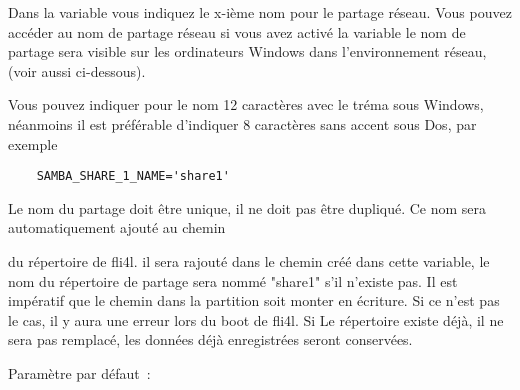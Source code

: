\begin{description}

        Dans la variable  vous indiquez le x-ième
        nom pour le partage réseau. Vous pouvez accéder au nom de partage
        réseau si vous avez activé la variable  le nom de partage
        sera visible sur les ordinateurs Windows dans l'environnement réseau,
        (voir aussi  ci-dessous).

        Vous pouvez indiquer pour le nom 12 caractères avec le tréma sous Windows,
        néanmoins il est préférable d'indiquer 8 caractères sans accent sous Dos,
        par exemple

\begin{example}
\begin{verbatim}
    SAMBA_SHARE_1_NAME='share1'
\end{verbatim}
\end{example}

        Le nom du partage doit être unique, il ne doit pas être
        dupliqué. Ce nom sera automatiquement ajouté au chemin


        du répertoire de fli4l. il sera rajouté dans le chemin créé dans cette
        variable, le nom du répertoire de partage sera nommé "share1" s'il
        n'existe pas. Il est impératif que le chemin dans la partition soit monter
        en écriture. Si ce n'est pas le cas, il y aura une erreur lors du boot
        de fli4l. Si Le répertoire existe déjà, il ne sera pas remplacé, les
        données déjà enregistrées seront conservées.

        Paramètre par défaut~: 

\end{description}


